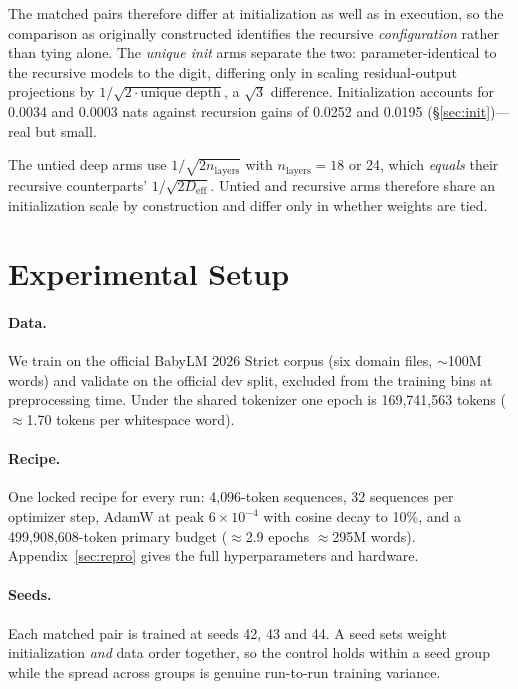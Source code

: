 \documentclass[11pt]{article}
\begin{document}
The matched pairs therefore differ at initialization as well as in execution, so the comparison as originally constructed identifies the recursive \emph{configuration} rather than tying alone. The \emph{unique init} arms separate the two: parameter-identical to the recursive models to the digit, differing only in scaling residual-output projections by $1/\sqrt{2 \cdot \text{unique depth}}$, a $\sqrt{3}$ difference. Initialization accounts for 0.0034 and 0.0003 nats against recursion gains of 0.0252 and 0.0195 (\S\ref{sec:init})---real but small.

The untied deep arms use $1/\sqrt{2 n_{\text{layers}}}$ with $n_{\text{layers}} = 18$ or 24, which \emph{equals} their recursive counterparts' $1/\sqrt{2 D_{\text{eff}}}$. Untied and recursive arms therefore share an initialization scale by construction and differ only in whether weights are tied.

\section{Experimental Setup}
\label{sec:setup}

\paragraph{Data.} We train on the official BabyLM 2026 Strict corpus (six domain files, ${\sim}$100M words) and validate on the official dev split, excluded from the training bins at preprocessing time. Under the shared tokenizer one epoch is 169{,}741{,}563 tokens ($\approx$1.70 tokens per whitespace word).

\paragraph{Recipe.} One locked recipe for every run: 4{,}096-token sequences, 32 sequences per optimizer step, AdamW at peak $6\times10^{-4}$ with cosine decay to 10\%, and a 499{,}908{,}608-token primary budget ($\approx$2.9 epochs $\approx$295M words). Appendix~\ref{sec:repro} gives the full hyperparameters and hardware.

\paragraph{Seeds.} Each matched pair is trained at seeds 42, 43 and 44. A seed sets weight initialization \emph{and} data order together, so the control holds within a seed group while the spread across groups is genuine run-to-run training variance.
\end{document}
